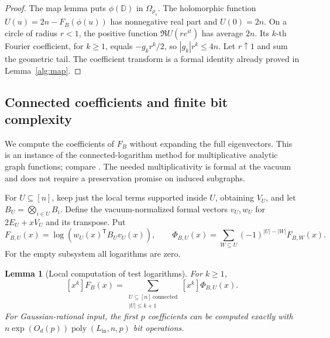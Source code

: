 \documentclass[reqno]{amsart}
\newtheorem{lemma}[theorem]{Lemma}
\theoremstyle{definition}
\theoremstyle{remark}
\newcommand{\D}{\mathbb D}
\begin{document}
\begin{proof}
The map lemma puts \(\phi(\D)\) in \(\Omega_{\rho_s}\).
The holomorphic function
\(U(u)=2n-F_B(\phi(u))\) has nonnegative real part and \(U(0)=2n\).
On a circle of radius \(r<1\), the positive function
\(\Re U(re^{it})\) has average \(2n\).
Its \(k\)-th Fourier coefficient, for \(k\ge1\), equals
\(-g_kr^k/2\), so \(|g_k|r^k\le4n\).
Let \(r\uparrow1\) and sum the geometric tail.
The coefficient transform is a formal identity already proved
in Lemma~\ref{alg:map}.
\end{proof}

\subsection{Connected coefficients and finite bit complexity}

We compute the coefficients of \(F_B\) without expanding the
full eigenvectors.  This is an instance of the connected-logarithm
method for multiplicative analytic graph functions; compare
\cite{PatelRegts17,YYZ22}.  The needed multiplicativity is formal
at the vacuum and does not require a preservation promise on
induced subgraphs.

For \(U\subseteq[n]\), keep just the local terms supported inside
\(U\), obtaining \(V_U\), and let \(B_U=\bigotimes_{i\in U}B_i\).
Define the vacuum-normalized formal vectors \(v_U,w_U\) for
\(2E_U+xV_U\) and its transpose.  Put
\[
 F_{B,U}(x)=\log(w_U(x)^{\mathsf T}B_Uv_U(x)),\qquad
 \Phi_{B,U}(x)=\sum_{W\subseteq U}(-1)^{|U|-|W|}F_{B,W}(x).
\]
For the empty subsystem all logarithms are zero.

\begin{lemma}[Local computation of test logarithms]
\label{alg:connected-tests}
For \(k\ge1\),
\[
 [x^k]F_B(x)=
 \sum_{\substack{U\subseteq[n]\ \mathrm{connected}\\ |U|\le k+1}}
                       [x^k]\Phi_{B,U}(x).
\]
For Gaussian-rational input, the first \(p\) coefficients can
be computed exactly with
\(n\exp(O_d(p))\operatorname{poly}(L_{\mathrm{in}},n,p)\)
bit operations.
\end{lemma}
\end{document}
